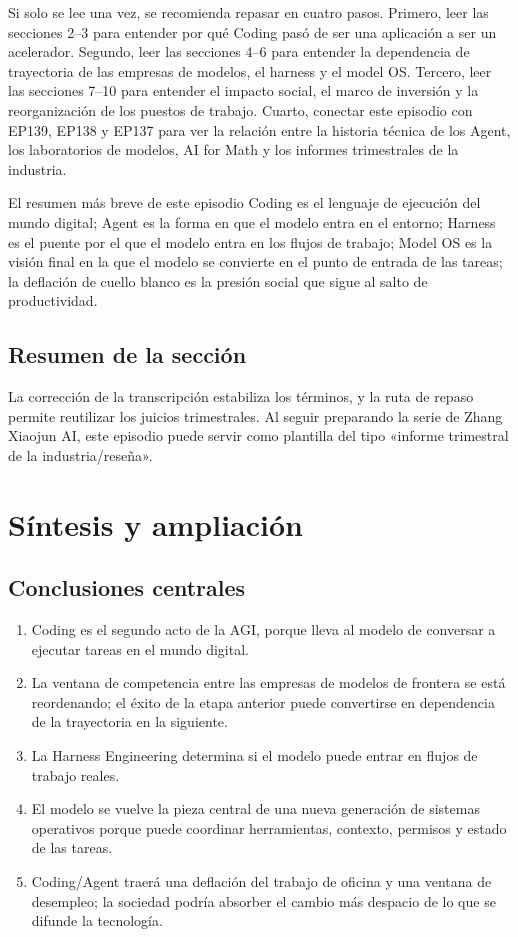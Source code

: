\documentclass[a4paper]{article}
\begin{document}
Si solo se lee una vez, se recomienda repasar en cuatro pasos. Primero, leer las secciones 2--3 para entender por qué Coding pasó de ser una aplicación a ser un acelerador. Segundo, leer las secciones 4--6 para entender la dependencia de trayectoria de las empresas de modelos, el harness y el model OS. Tercero, leer las secciones 7--10 para entender el impacto social, el marco de inversión y la reorganización de los puestos de trabajo. Cuarto, conectar este episodio con EP139, EP138 y EP137 para ver la relación entre la historia técnica de los Agent, los laboratorios de modelos, AI for Math y los informes trimestrales de la industria.

\begin{knowledgebox}{El resumen más breve de este episodio}
Coding es el lenguaje de ejecución del mundo digital; Agent es la forma en que el modelo entra en el entorno; Harness es el puente por el que el modelo entra en los flujos de trabajo; Model OS es la visión final en la que el modelo se convierte en el punto de entrada de las tareas; la deflación de cuello blanco es la presión social que sigue al salto de productividad.
\end{knowledgebox}

\subsection{Resumen de la sección}

La corrección de la transcripción estabiliza los términos, y la ruta de repaso permite reutilizar los juicios trimestrales. Al seguir preparando la serie de Zhang Xiaojun AI, este episodio puede servir como plantilla del tipo «informe trimestral de la industria/reseña».
\section{Síntesis y ampliación}

\subsection{Conclusiones centrales}

\begin{enumerate}
\item Coding es el segundo acto de la AGI, porque lleva al modelo de conversar a ejecutar tareas en el mundo digital.
\item La ventana de competencia entre las empresas de modelos de frontera se está reordenando; el éxito de la etapa anterior puede convertirse en dependencia de la trayectoria en la siguiente.
\item La Harness Engineering determina si el modelo puede entrar en flujos de trabajo reales.
\item El modelo se vuelve la pieza central de una nueva generación de sistemas operativos porque puede coordinar herramientas, contexto, permisos y estado de las tareas.
\item Coding/Agent traerá una deflación del trabajo de oficina y una ventana de desempleo; la sociedad podría absorber el cambio más despacio de lo que se difunde la tecnología.
\end{enumerate}
\end{document}

